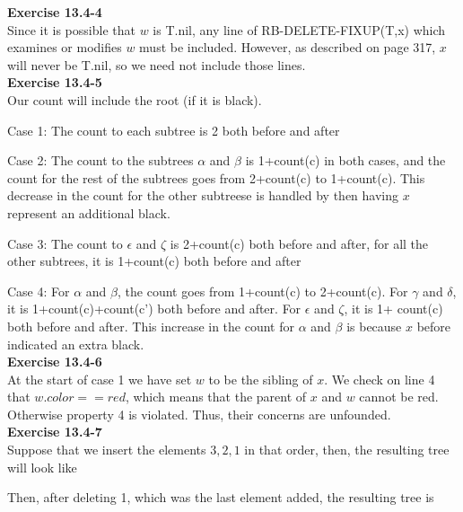 \documentclass{article}
\begin{document}
\noindent\textbf{Exercise 13.4-4} \\

Since it is possible that $w$ is T.nil, any line of RB-DELETE-FIXUP(T,x) which examines or modifies $w$ must be included.  However, as described on page 317, $x$ will never be T.nil, so we need not include those lines. \\

\noindent\textbf{ Exercise 13.4-5} \\

Our count will include the root (if it is black).

Case 1: The count to each subtree is 2 both before and after

Case 2: The count to the subtrees $\alpha$ and $\beta$ is 1+count(c) in both cases, and the count for the rest of the subtrees goes from 2+count(c) to 1+count(c). This decrease in the count for the other subtreese is handled by then having $x$ represent an additional black.

Case 3: The count to $\epsilon$ and $\zeta$ is 2+count(c) both before and after, for all the other subtrees, it is 1+count(c) both before and after

Case 4: For $\alpha$ and $\beta$, the count goes from 1+count(c) to 2+count(c). For $\gamma$ and $\delta$, it is 1+count(c)+count(c') both before and after. For $\epsilon$ and $\zeta$, it is 1+ count(c) both before and after. This increase in the count for $\alpha$ and $\beta$ is because $x$ before indicated an extra black.\\


\noindent\textbf{Exercise 13.4-6}\\

At the start of case 1 we have set $w$ to be the sibling of $x$.  We check on line 4 that $w.color == red$, which means that the parent of $x$ and $w$ cannot be red.  Otherwise property 4 is violated.  Thus, their concerns are unfounded. \\

\noindent\textbf{ Exercise 13.4-7} \\

Suppose that we insert the elements $3,2,1$ in that order, then, the resulting tree will look like

Then, after deleting 1, which was the last element added, the resulting tree is 
\end{document}
